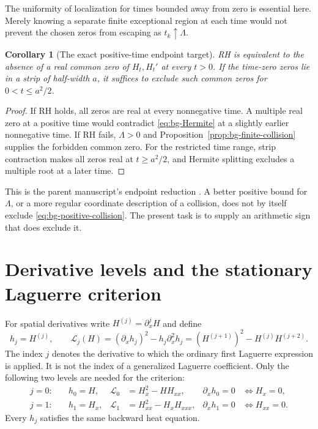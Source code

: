 \documentclass[11pt]{article}
\numberwithin{equation}{section}
\newtheorem{corollary}[theorem]{Corollary}
\theoremstyle{definition}
\theoremstyle{remark}
\begin{document}
The uniformity of localization for times bounded away from zero is
essential here. Merely knowing a separate finite exceptional region at
each time would not prevent the chosen zeros from escaping as
$t_k\uparrow\Lambda$.

\begin{corollary}[The exact positive-time endpoint target]
\label{cor:bg-exact-route}
RH is equivalent to the absence of a real common zero of $H_t,H_t'$
at every $t>0$. If the time-zero zeros lie in a strip of half-width $a$,
it suffices to exclude such common zeros for $0<t\le a^2/2$.
\end{corollary}
\begin{proof}
If RH holds, all zeros are real at every nonnegative time. A multiple
real zero at a positive time would contradict
\eqref{eq:bg-Hermite} at a slightly earlier nonnegative time. If RH
fails, $\Lambda>0$ and Proposition~\ref{prop:bg-finite-collision}
supplies the forbidden common zero. For the restricted time range, strip
contraction makes all zeros real at $t\ge a^2/2$, and Hermite splitting
excludes a multiple root at a later time.
\end{proof}

This is the parent manuscript's endpoint reduction
\cite{parentcollision}. A better positive bound for $\Lambda$, or a
more regular coordinate description of a collision, does not by itself
exclude \eqref{eq:bg-positive-collision}. The present task is to supply
an arithmetic sign that does exclude it.

\section{Derivative levels and the stationary Laguerre criterion}
\label{sec:background-stationary}

For spatial derivatives write $H^{(j)}=\partial_x^jH$ and define
\begin{equation}
 h_j=H^{(j)},\qquad
 \mathscr L_j(H)=(\partial_xh_j)^2-h_j\partial_x^2h_j
 =(H^{(j+1)})^2-H^{(j)}H^{(j+2)}.
 \label{eq:bg-Laguerre-level}
\end{equation}
The index $j$ denotes the derivative to which the ordinary first
Laguerre expression is applied. It is not the index of a generalized
Laguerre coefficient. Only the following two levels are needed for the
criterion:
\begin{align}
 j=0:\quad &h_0=H,
 &\mathscr L_0&=H_x^2-HH_{xx},
 &\partial_xh_0=0&\iff H_x=0,\nonumber\\
 j=1:\quad &h_1=H_x,
 &\mathscr L_1&=H_{xx}^2-H_xH_{xxx},
 &\partial_xh_1=0&\iff H_{xx}=0.
 \label{eq:bg-two-levels}
\end{align}
Every $h_j$ satisfies the same backward heat equation.
\end{document}
